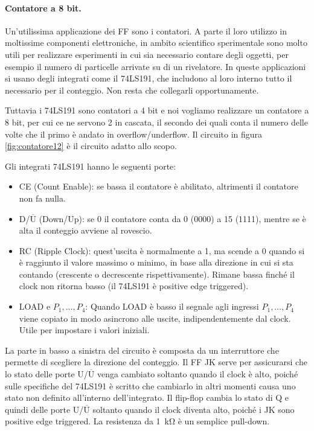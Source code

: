 \paragraph{Contatore a 8 bit.}

Un'utilissima applicazione dei FF sono i contatori. A parte il loro utilizzo in moltissime componenti
elettroniche, in ambito scientifico sperimentale sono molto utili per realizzare esperimenti
in cui sia necessario contare degli oggetti, per esempio il numero di particelle arrivate su di un rivelatore.
In queste applicazioni si usano degli integrati come il 74LS191, che includono al loro interno tutto il necessario
per il conteggio. Non resta che collegarli opportunamente.

Tuttavia i 74LS191 sono contatori a 4 bit e noi vogliamo realizzare un contatore a 8 bit, per
cui ce ne servono 2 in cascata, il secondo dei quali conta il numero delle volte che il primo
è andato in overflow/underflow. Il circuito in figura \ref{fig:contatore12} è il circuito adatto allo scopo.

Gli integrati 74LS191 hanno le seguenti porte:

\begin{itemize}
    \item{CE (Count Enable): se bassa il contatore è abilitato, altrimenti il contatore non fa nulla.}
    \item{D/$\overline{\text{U}}$ (Down/Up): se 0 il contatore conta da 0 (0000) a 15 (1111), mentre se
        è alta il conteggio avviene al rovescio.}
    \item{RC (Ripple Clock): quest'uscita è normalmente a 1, ma scende a 0 quando si è raggiunto il valore massimo
        o minimo, in base alla direzione in cui si sta contando (crescente o decrescente rispettivamente).
        Rimane bassa finché il clock non ritorna basso (il 74LS191 è positive edge triggered).}
    \item{LOAD e $P_1,\dots,P_4$: Quando LOAD è basso il segnale agli ingressi $P_1,\dots,P_4$ viene copiato
        in modo asincrono alle uscite, indipendentemente dal clock. Utile per impostare i valori iniziali.}
\end{itemize}

La parte in basso a sinistra del circuito è composta da un interruttore che permette di scegliere la direzione
del conteggio. Il FF JK serve per assicurarsi che lo stato delle porte U/$\overline{\text{U}}$ venga cambiato
soltanto quando il clock è alto, poiché sulle specifiche del 74LS191 è scritto che cambiarlo in altri momenti
causa uno stato non definito all'interno dell'integrato. Il flip-flop cambia lo stato di Q e quindi delle porte
U/$\overline{\text{U}}$ soltanto quando il clock diventa alto, poiché i JK sono positive edge triggered.
La resistenza da \SI{1}{\kilo\ohm} è un semplice pull-down.

